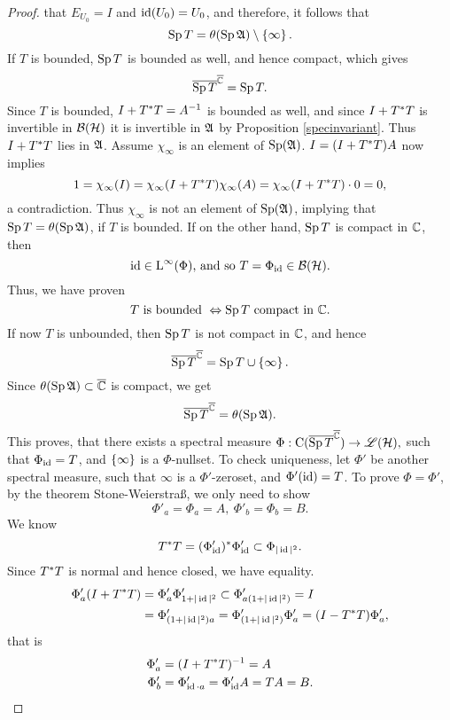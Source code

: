 \begin{proof}
that $E_{U_0} = I$ and $\operatorname{id}(U_0) = U_0$, and therefore, it follows that
\[
 \operatorname{Sp} T = \theta ( \operatorname{Sp} \mathfrak{A} ) \setminus \left\lbrace \infty \right\rbrace.
\]
If $T$ is bounded, $\operatorname{Sp} T$ is bounded as well, and hence compact, which gives
\[
\overline{\operatorname{Sp} T }^{{\overline{\mathbb{C}}}} = \operatorname{Sp} T.
\]
Since $T$ is bounded, $I + T^{*} T = A^{-1}$ is bounded as well, and since 
$I +T ^{*} T$ is invertible in $\mathcal{B}(\mathcal{H})$ it is invertible in $\mathfrak{A}$ by Proposition
\ref{specinvariant}. Thus $I + T ^{*} T $ lies in $\mathfrak{A}$. Assume $\chi_\infty$ is an
element of $\operatorname{Sp}(\mathfrak{A})$. $I = (I +T ^{*} T )A$
now implies
\[
 1 = \chi_\infty (I) = \chi_\infty ( I+ T ^{*} T) \chi_\infty ( A) = 
 \chi_\infty ( I + T ^{*} T) \cdot 0 = 0 ,
\]
a contradiction. Thus  $\chi_\infty$ is not an element of $\operatorname{Sp}(\mathfrak{A})$, implying
that $ \operatorname{Sp} T  = \theta ( \operatorname{Sp} \mathfrak{A} )$, if $T$  is bounded.
If on the other hand, $\operatorname{Sp} T$ is compact in $\mathbb{C}$, then 
\[
 \operatorname{id} \in {\text{L}^\infty }(\Phi) \text{, and so } T= \Phi_{\operatorname{id}} \in \mathcal{B}(\mathcal{H}).
\]
Thus, we have proven 
\[
 T \text{ is bounded } \Leftrightarrow \operatorname{Sp} T \text{ compact in } \mathbb{C}.
\]
If now $T$ is unbounded, then $\operatorname{Sp} T$ is not compact in $\mathbb{C}$, and hence
\[
\overline{\operatorname{Sp} T}^{{\overline{\mathbb{C}}}} = \operatorname{Sp} T \cup \left\lbrace \infty \right\rbrace.
\]
Since $\theta(\operatorname{Sp} \mathfrak{A}) \subset {\overline{\mathbb{C}}}$ is compact, we get
\[
 \overline{\operatorname{Sp} T}^{{\overline{\mathbb{C}}}} = \theta ( \operatorname{Sp} \mathfrak{A}).
\]
This proves, that there exists a spectral measure 
$\Phi : \operatorname{C}(\overline{\operatorname{Sp} T}^{{\overline{\mathbb{C}}}}) \to \mathscr{L}(\mathcal{H}),$ such that $\Phi_{\operatorname{id}} = T$,
and $\left\lbrace \infty \right\rbrace$ is a $\Phi$-nullset.
 To check uniqueness, let $\Phi'$ be another spectral measure, such that
$\infty$ is a $\Phi'$-zeroset, and $\Phi'( \operatorname{id}) = T$. To prove $\Phi = \Phi'$,
by the theorem Stone-Weierstraß, we only need to show
\[
 \Phi'_a = \Phi_a = A,~ \Phi'_b = \Phi_b=B.
\]
We know
\[
 T^{*} T = (\Phi'_{\operatorname{id}}) ^{*} \Phi'_{\operatorname{id}} \subset \Phi_{|\operatorname{id}|^2}.
\]
Since $T^{*} T$ is normal and hence closed, we have equality.
\begin{align*}
 \Phi'_a ( I + T ^{*} T ) &= \Phi'_a \Phi'_{1 +| \operatorname{id} | ^2} \subset 
 \Phi'_{a (1 + |\operatorname{id}|^2)} = I \\&= \Phi'_{ (1 + |\operatorname{id}|^2)a} 
 = \Phi'_{(1 + |\operatorname{id}|^2)}\Phi'_{a}  = (I - T ^{*} T) \Phi'_a,
 \end{align*}
 that is 
 \begin{align*}
 \Phi'_a &= (I + T ^{*} T)^{-1} = A \\
 \Phi'_b &= \Phi'_{\operatorname{id} \cdot a} = \Phi'_{\operatorname{id}} A = TA = B.
\end{align*}
\end{proof}



















